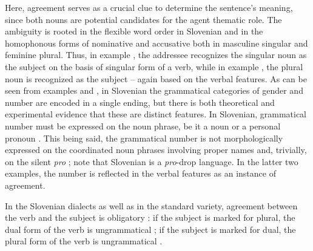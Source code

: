 \documentclass[output=paper,colorlinks,citecolor=brown]{langscibook}
\begin{document}
\noindent Here, agreement serves as a crucial clue to determine the sentence’s  meaning, since both nouns are potential candidates for the agent thematic role. The ambiguity is rooted in the flexible word order in Slovenian and in the homophonous forms of nominative and accusative both in masculine singular and feminine plural. Thus, in example , the addressee recognizes the singular noun  as the subject on the basis of singular form of a verb, while in example , the plural noun  is recognized as the subject -- again based on the verbal features. As can be seen from examples  and , in Slovenian the grammatical categories of gender and number are encoded in a single ending, but there is both theoretical and experimental evidence that these are distinct features.
In Slovenian, grammatical number must be expressed on the noun phrase, be it a noun  or a personal pronoun . This being said, the grammatical number is not morphologically expressed on the coordinated noun phrases involving proper names  and, trivially, on the silent \textit{pro} ; note that Slovenian is a \textit{pro}-drop language. In the latter two examples, the number is reflected in the verbal features as an instance of agreement.


\ea \label{pav:ex:3}
 \label{pav:ex:3a}
 \label{pav:ex:3b}
 \label{pav:ex:3c}
 \label{pav:ex:3d}
\z
\z
  
\noindent In the Slovenian dialects as well as in the standard variety, agreement between the verb and the subject is obligatory \citep[271]{pav+:Toporisic2000}: if the subject is marked for plural, the dual form of the verb is ungrammatical ; if the subject is marked for dual, the plural form of the verb is ungrammatical .
\end{document}
